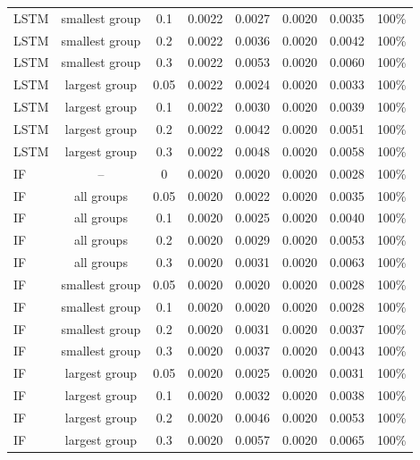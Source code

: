 \documentclass[10pt,onecolumn,letterpaper]{article}
\begin{document}
\begin{table}[!t]
{\begin{tabular}{lccccccc}
LSTM & smallest group & 0.1 & 0.0022 & 0.0027 & 0.0020 & 0.0035 & 100\% \\
LSTM & smallest group & 0.2 & 0.0022 & 0.0036 & 0.0020 & 0.0042 & 100\% \\
LSTM & smallest group & 0.3 & 0.0022 & 0.0053 & 0.0020 & 0.0060 & 100\% \\
LSTM & largest group & 0.05 & 0.0022 & 0.0024 & 0.0020 & 0.0033 & 100\% \\
LSTM & largest group & 0.1 & 0.0022 & 0.0030 & 0.0020 & 0.0039 & 100\% \\
LSTM & largest group & 0.2 & 0.0022 & 0.0042 & 0.0020 & 0.0051 & 100\% \\
LSTM & largest group & 0.3 & 0.0022 & 0.0048 & 0.0020 & 0.0058 & 100\% \\
IF & -- & 0 & 0.0020 & 0.0020 & 0.0020 & 0.0028 & 100\% \\
IF & all groups & 0.05 & 0.0020 & 0.0022 & 0.0020 & 0.0035 & 100\% \\
IF & all groups & 0.1 & 0.0020 & 0.0025 & 0.0020 & 0.0040 & 100\% \\
IF & all groups & 0.2 & 0.0020 & 0.0029 & 0.0020 & 0.0053 & 100\% \\
IF & all groups & 0.3 & 0.0020 & 0.0031 & 0.0020 & 0.0063 & 100\% \\
IF & smallest group & 0.05 & 0.0020 & 0.0020 & 0.0020 & 0.0028 & 100\% \\
IF & smallest group & 0.1 & 0.0020 & 0.0020 & 0.0020 & 0.0028 & 100\% \\
IF & smallest group & 0.2 & 0.0020 & 0.0031 & 0.0020 & 0.0037 & 100\% \\
IF & smallest group & 0.3 & 0.0020 & 0.0037 & 0.0020 & 0.0043 & 100\% \\
IF & largest group & 0.05 & 0.0020 & 0.0025 & 0.0020 & 0.0031 & 100\% \\
IF & largest group & 0.1 & 0.0020 & 0.0032 & 0.0020 & 0.0038 & 100\% \\
IF & largest group & 0.2 & 0.0020 & 0.0046 & 0.0020 & 0.0053 & 100\% \\
IF & largest group & 0.3 & 0.0020 & 0.0057 & 0.0020 & 0.0065 & 100\% \\
\bottomrule
\end{tabular}}
\end{table}
\end{document}
